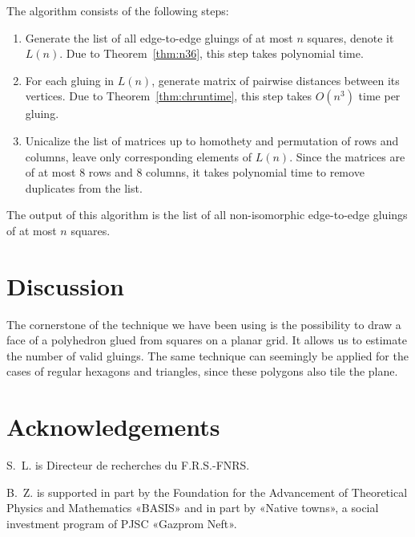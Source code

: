 \documentclass[a4paper,11pt]{article}
\begin{document}
The algorithm consists of the following steps:

\begin{enumerate}
	\item Generate the list of all edge-to-edge gluings of at most $n$ squares,
	denote it $L(n)$. Due to Theorem~\ref{thm:n36}, this step takes polynomial time.
	\item For each gluing in $L(n)$, generate matrix of pairwise distances
	between its vertices. Due to Theorem~\ref{thm:chruntime},
	this step takes $O(n^3)$ time per gluing.
	\item Unicalize the list of matrices up to homothety and permutation of rows and columns, leave only corresponding elements of $L(n)$. Since the matrices are of at most 8 rows and 8 columns, it takes polynomial time to remove duplicates from the list.
\end{enumerate}

The output of this algorithm is the list of all non-isomorphic edge-to-edge gluings of at most $n$ squares.

\section{Discussion}

The cornerstone of the technique we have been using is the possibility to draw a face of a polyhedron glued from squares on a planar grid. It allows us to estimate the number of valid gluings. The same technique can seemingly be applied for the cases of regular hexagons and triangles, since these polygons also tile the plane.

\section*{Acknowledgements}

S.~L. is Directeur de recherches du F.R.S.-FNRS.

B.~Z. is supported in part by the Foundation for the Advancement of Theoretical Physics and Mathematics «BASIS» and in part by «Native towns», a social investment program of PJSC «Gazprom Neft».

{}

\end{document}
